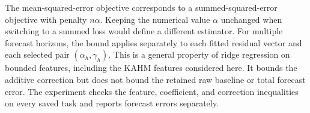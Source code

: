 The mean-squared-error objective corresponds to a summed-squared-error
objective with penalty $n\alpha$. Keeping the numerical value $\alpha$
unchanged when switching to a summed loss would define a different
estimator. For multiple forecast horizons, the bound applies separately
to each fitted residual vector and each selected pair
$(\alpha_h,\gamma_h)$. This is a general property of ridge regression
on bounded features, including the KAHM features considered here. It
bounds the additive correction but does not bound the retained raw
baseline or total forecast error. The experiment checks the feature,
coefficient, and correction inequalities on every saved task and reports
forecast errors separately.
